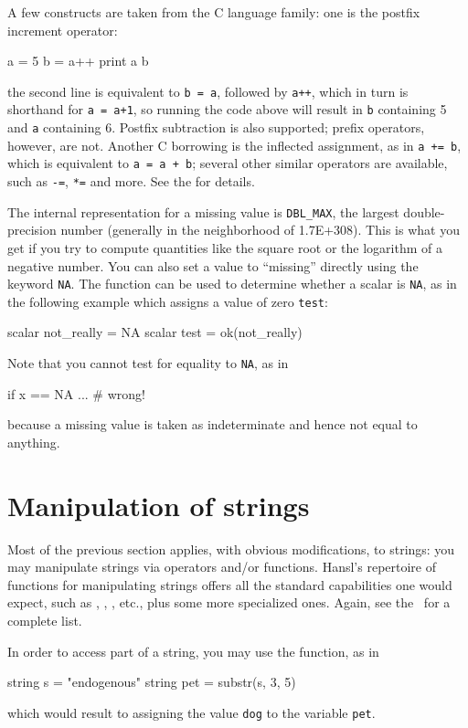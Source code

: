 A few constructs are taken from the C language family: one is the
postfix increment operator:
\begin{code}
  a = 5
  b = a++
  print a b
\end{code}
the second line is equivalent to \texttt{b = a}, followed by
\texttt{a++}, which in turn is shorthand for \texttt{a = a+1}, so
running the code above will result in \texttt{b} containing 5 and
\texttt{a} containing 6. Postfix subtraction is also supported; prefix
operators, however, are not. Another C borrowing is the inflected
assignment, as in \texttt{a += b}, which is equivalent to \texttt{a =
  a + b}; several other similar operators are available, such as
\texttt{-=}, \texttt{*=} and more. See the \GCR{} for details.

The internal representation for a missing value is \texttt{DBL\_MAX},
the largest double-precision number (generally in the neighborhood of
1.7E+308). This is what you get if you try to compute quantities like
the square root or the logarithm of a negative number. You can also
set a value to ``missing'' directly using the keyword \texttt{NA}.
The function  can be used to determine whether a scalar is
\texttt{NA}, as in the following example which assigns a value of zero
\texttt{test}:
\begin{code}
  scalar not_really = NA
  scalar test = ok(not_really)
\end{code}
Note that you cannot test for equality to \texttt{NA}, as in
\begin{code}
  if x == NA ... # wrong!
\end{code}
because a missing value is taken as indeterminate and hence not equal
to anything.

\section{Manipulation of strings}

Most of the previous section applies, with obvious modifications, to
strings: you may manipulate strings via operators and/or
functions. Hansl's repertoire of functions for manipulating strings
offers all the standard capabilities one would expect, such as
, , , etc., plus some more
specialized ones. Again, see the \GCR\ for a complete list.

In order to access part of a string, you may use the 
function, as in
\begin{code}
  string s = "endogenous"
  string pet = substr(s, 3, 5)
\end{code}
which would result to assigning the value \texttt{dog} to the variable
\texttt{pet}.

